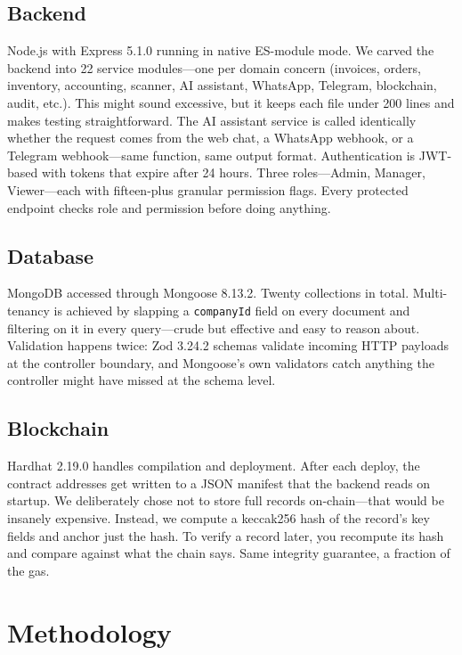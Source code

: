 \documentclass[conference]{IEEEtran}
\begin{document}
\subsection{Backend}
Node.js with Express 5.1.0 running in native ES-module mode. We carved the backend into 22 service modules---one per domain concern (invoices, orders, inventory, accounting, scanner, AI assistant, WhatsApp, Telegram, blockchain, audit, etc.). This might sound excessive, but it keeps each file under 200 lines and makes testing straightforward. The AI assistant service is called identically whether the request comes from the web chat, a WhatsApp webhook, or a Telegram webhook---same function, same output format. Authentication is JWT-based with tokens that expire after 24 hours. Three roles---Admin, Manager, Viewer---each with fifteen-plus granular permission flags. Every protected endpoint checks role and permission before doing anything.

\subsection{Database}
MongoDB accessed through Mongoose 8.13.2. Twenty collections in total. Multi-tenancy is achieved by slapping a \texttt{companyId} field on every document and filtering on it in every query---crude but effective and easy to reason about. Validation happens twice: Zod 3.24.2 schemas validate incoming HTTP payloads at the controller boundary, and Mongoose's own validators catch anything the controller might have missed at the schema level.

\subsection{Blockchain}
Hardhat 2.19.0 handles compilation and deployment. After each deploy, the contract addresses get written to a JSON manifest that the backend reads on startup. We deliberately chose not to store full records on-chain---that would be insanely expensive. Instead, we compute a keccak256 hash of the record's key fields and anchor just the hash. To verify a record later, you recompute its hash and compare against what the chain says. Same integrity guarantee, a fraction of the gas.

\section{Methodology}
\end{document}
